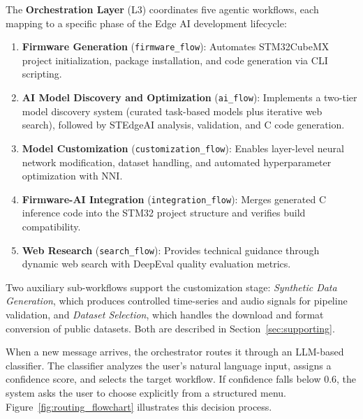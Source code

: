 The \textbf{Orchestration Layer} (L3) coordinates five agentic workflows, each mapping to a specific phase of the Edge AI development lifecycle:

\begin{enumerate}
    \item \textbf{Firmware Generation} (\texttt{firmware\_flow}): Automates STM32CubeMX project initialization, package installation, and code generation via CLI scripting.
    \item \textbf{AI Model Discovery and Optimization} (\texttt{ai\_flow}): Implements a two-tier model discovery system (curated task-based models plus iterative web search), followed by STEdgeAI analysis, validation, and C code generation.
    \item \textbf{Model Customization} (\texttt{customization\_flow}): Enables layer-level neural network modification, dataset handling, and automated hyperparameter optimization with NNI.
    \item \textbf{Firmware-AI Integration} (\texttt{integration\_flow}): Merges generated C inference code into the STM32 project structure and verifies build compatibility.
    \item \textbf{Web Research} (\texttt{search\_flow}): Provides technical guidance through dynamic web search with DeepEval quality evaluation metrics.
\end{enumerate}

Two auxiliary sub-workflows support the customization stage: \textit{Synthetic Data Generation}, which produces controlled time-series and audio signals for pipeline validation, and \textit{Dataset Selection}, which handles the download and format conversion of public datasets. Both are described in Section~\ref{sec:supporting}.

When a new message arrives, the orchestrator routes it through an LLM-based classifier. The classifier analyzes the user's natural language input, assigns a confidence score, and selects the target workflow. If confidence falls below $0.6$, the system asks the user to choose explicitly from a structured menu. Figure~\ref{fig:routing_flowchart} illustrates this decision process.

